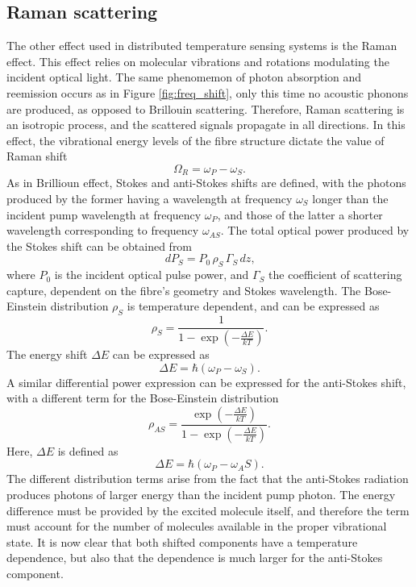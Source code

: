\documentclass{standalone}
\begin{document}
\subsection{Raman scattering}
The other effect used in distributed temperature sensing systems is the Raman effect. This effect relies on molecular vibrations and rotations modulating the incident optical light. The same phenomemon of photon absorption and reemission occurs as in Figure \ref{fig:freq_shift}, only this time no acoustic phonons are produced, as opposed to Brillouin scattering. Therefore, Raman scattering is an isotropic process, and the scattered signals propagate in all directions. In this effect, the vibrational energy levels of the fibre structure dictate the value of Raman shift
\begin{equation}
\Omega_R = \omega_P - \omega_S \textrm{.}
\end{equation}
As in Brillioun effect, Stokes and anti-Stokes shifts are defined, with the photons produced by the former having a wavelength at frequency $\omega_S$ longer than the incident pump wavelength at frequency $\omega_P$, and those of the latter a shorter wavelength corresponding to frequency $\omega_{AS}$. The total optical power produced by the Stokes shift can be obtained from 
\begin{equation}
dP_S = P_0 \, \rho_S \, \Gamma_S \, dz \textrm{,}
\end{equation}
where $P_0$ is the incident optical pulse power, and $\Gamma_S$ the coefficient of scattering capture, dependent on the fibre's geometry and Stokes wavelength. The Bose-Einstein distribution $\rho_S$ is temperature dependent, and can be expressed as
\begin{equation} \label{eq:be-s}
\rho_S = \frac{1}{1- \exp\left( - \frac{\varDelta E}{k T} \right)} \textrm{.}
\end{equation}
The energy shift $\varDelta E$ can be expressed as
\begin{equation}
\varDelta E = \hbar \left( \omega_P - \omega_S \right) \textrm{.}
\end{equation}
A similar differential power expression can be expressed for the anti-Stokes shift, with a different term for the Bose-Einstein distribution
\begin{equation} \label{eq:be-as}
\rho_{AS} = \frac{\exp\left( - \frac{\varDelta E}{k T} \right)}{1 - \exp\left( - \frac{\varDelta E}{k T} \right)} \textrm{.}
\end{equation}
Here, $\varDelta E$ is defined as
\begin{equation}
\varDelta E = \hbar \left( \omega_P - \omega_AS \right) \textrm{.}
\end{equation}
The different distribution terms arise from the fact that the anti-Stokes radiation produces photons of larger energy than the incident pump photon. The energy difference must be provided by the excited molecule itself, and therefore the term must account for the number of molecules available in the proper vibrational state. It is now clear that both shifted components have a temperature dependence, but also that the dependence is much larger for the anti-Stokes component.
\end{document}
